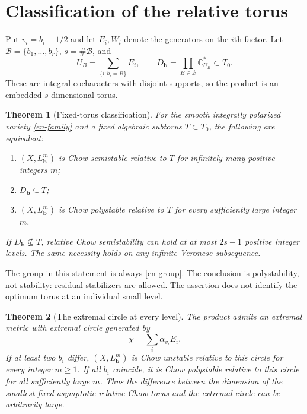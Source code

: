 \documentclass[12pt]{amsart}
\newtheorem{thm}{Theorem}[section]
\theoremstyle{definition}
\theoremstyle{remark}
\numberwithin{equation}{section}
\newcommand{\C}{\mathbb{C}}
\begin{document}
\section{Classification of the relative torus}

Put $v_i=b_i+1/2$ and let $E_i,W_i$ denote the generators on the $i$th factor. Let $\mathcal B=\{b_1,\ldots,b_r\}$, $s=\#\mathcal B$, and
\begin{equation}\label{en-D}
 U_B=\sum_{\{i:b_i=B\}}E_i,\qquad
 D_{\boldsymbol b}=\prod_{B\in\mathcal B}\C^*_{U_B}\subset T_0.
\end{equation}
These are integral cocharacters with disjoint supports, so the product is an embedded $s$-dimensional torus.

\begin{thm}[Fixed-torus classification]\label{en-classification}
For the smooth integrally polarized variety \eqref{en-family} and a fixed algebraic subtorus $T\subset T_0$, the following are equivalent:
\begin{enumerate}
\item $(X,L_{\boldsymbol b}^m)$ is Chow semistable relative to $T$ for infinitely many positive integers $m$;
\item $D_{\boldsymbol b}\subseteq T$;
\item $(X,L_{\boldsymbol b}^m)$ is Chow polystable relative to $T$ for every sufficiently large integer $m$.
\end{enumerate}
If $D_{\boldsymbol b}\nsubseteq T$, relative Chow semistability can hold at at most $2s-1$ positive integer levels. The same necessity holds on any infinite Veronese subsequence.
\end{thm}

The group in this statement is always \eqref{en-group}. The conclusion is polystability, not stability: residual stabilizers are allowed. The assertion does not identify the optimum torus at an individual small level.

\begin{thm}[The extremal circle at every level]\label{en-circle}
The product admits an extremal metric with extremal circle generated by
\begin{equation}\label{en-chi}
 \chi=\sum_i\alpha_{v_i}E_i.
\end{equation}
If at least two $b_i$ differ, $(X,L_{\boldsymbol b}^m)$ is Chow unstable relative to this circle for every integer $m\geq1$. If all $b_i$ coincide, it is Chow polystable relative to this circle for all sufficiently large $m$. Thus the difference between the dimension of the smallest fixed asymptotic relative Chow torus and the extremal circle can be arbitrarily large.
\end{thm}
\end{document}
